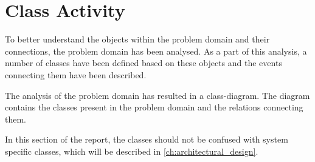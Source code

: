 \section{Class Activity} \label{sc:class_activity}
To better understand the objects within the problem domain and their connections, the problem domain has been analysed. As a part of this analysis, a number of classes have been defined based on these objects and the events connecting them have been described.
\par

The analysis of the problem domain has resulted in a class-diagram. The diagram contains the classes present in the problem domain and the relations connecting them.
\par



In this section of the report, the classes should not be confused with system specific classes, which will be described in \autoref{ch:architectural_design}.
